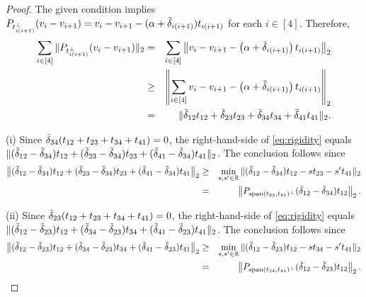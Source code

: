 \begin{proof}
The given condition implies $P_{t_{i(i+1)}^{\perp}}(v_{i}-v_{i+1})=v_{i}-v_{i+1}-(\alpha+\tilde{\delta}_{i(i+1)})t_{i(i+1)}$
for each $i \in [4]$. Therefore,
\begin{eqnarray}
\sum_{i \in [4]}\|P_{t_{i(i+1)}^{\perp}}(v_{i}-v_{i+1})\|_2 & = & \sum_{i \in [4]}\left\| v_{i}-v_{i+1}-\left(\alpha+\tilde{\delta}_{i(i+1)}\right)t_{i(i+1)}\right\|_2 \nonumber \\
 & \ge & \left\| \sum_{i \in [4] }v_{i}-v_{i+1}-\left(\alpha+\tilde{\delta}_{i(i+1)}\right)t_{i(i+1)}\right\|_2 \nonumber \\
 & = & \|\tilde{\delta}_{12}t_{12}+\tilde{\delta}_{23}t_{23}+\tilde{\delta}_{34}t_{34}+\tilde{\delta}_{41}t_{41}\|_2. \label{eq:rigidity}
\end{eqnarray}

\noindent (i) Since $\tilde{\delta}_{34}(t_{12}+t_{23}+t_{34}+t_{41})=0$, the right-hand-side of
\eqref{eq:rigidity} equals $\|(\tilde{\delta}_{12}-\tilde{\delta}_{34})t_{12}+(\tilde{\delta}_{23}-\tilde{\delta}_{34})t_{23}+(\tilde{\delta}_{41}-\tilde{\delta}_{34})t_{41}\|_2$.
The conclusion follows since
\begin{eqnarray*}
\left\| (\tilde{\delta}_{12}-\tilde{\delta}_{34})t_{12}+(\tilde{\delta}_{23}-\tilde{\delta}_{34})t_{23}+(\tilde{\delta}_{41}-\tilde{\delta}_{34})t_{41}\right\|_2  & \ge & \min_{s,s'\in\mathbb{R}}\|(\tilde{\delta}_{12}-\tilde{\delta}_{34})t_{12}-st_{23}-s't_{41}\|_2\\
 & = & \left\| P_{\operatorname{span}(t_{23},t_{41})^{\perp}}(\tilde{\delta}_{12}-\tilde{\delta}_{34})t_{12}\right\|_2.
\end{eqnarray*}

\noindent (ii) Since $\tilde{\delta}_{23}(t_{12}+t_{23}+t_{34}+t_{41})=0$, the right-hand-side
of \eqref{eq:rigidity} equals $\|(\tilde{\delta}_{12}-\tilde{\delta}_{23})t_{12}+(\tilde{\delta}_{34}-\tilde{\delta}_{23})t_{34}+(\tilde{\delta}_{41}-\tilde{\delta}_{23})t_{41}\|_2$.
The conclusion follows since
\begin{eqnarray*}
\left\| (\tilde{\delta}_{12}-\tilde{\delta}_{23})t_{12}+(\tilde{\delta}_{34}-\tilde{\delta}_{23})t_{34}+(\tilde{\delta}_{41}-\tilde{\delta}_{23})t_{41}\right\|_2  & \ge & \min_{s,s'\in\mathbb{R}}\|(\tilde{\delta}_{12}-\tilde{\delta}_{23})t_{12}-st_{34}-s't_{41}\|_2\\
 & = & \left\| P_{\operatorname{span}(t_{34},t_{41})^{\perp}}(\tilde{\delta}_{12}-\tilde{\delta}_{23})t_{12}\right\|_2.\qedhere
\end{eqnarray*}
\end{proof}




